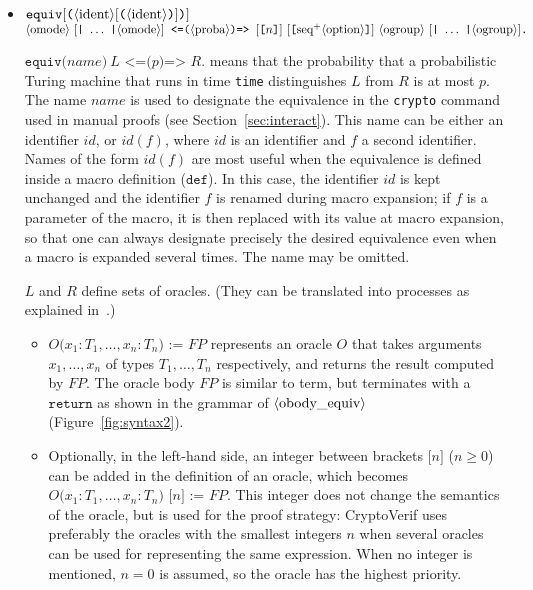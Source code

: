 \begin{itemize}
\ifchannels
\item $\texttt{equiv}[\texttt{(}\langle\textrm{ident}\rangle[\texttt{(}\langle\textrm{ident}\rangle\texttt{)}]\texttt{)}]$\\
$\nonterm{omode}\ [\texttt{|}\ \ldots\ \texttt{|}\nonterm{omode}]\texttt{ <=(}\nonterm{proba}\texttt{)=> }
[\texttt{[}n\texttt{]}]\ [\texttt{[}\neseq{option}\texttt{]}]\ \nonterm{ogroup}\ [\texttt{|}\ \ldots\ \texttt{|}\nonterm{ogroup}]\texttt{.}$

$\texttt{equiv(}\mathit{name}\texttt{)}\ L\texttt{ <=(}p\texttt{)=> }R\texttt{.}$ means that the
probability that a probabilistic Turing machine that runs in time
{\tt time} distinguishes $L$ from $R$ is at most $p$. The name $\mathit{name}$
is used to designate the equivalence in the \texttt{crypto} command used in manual proofs (see Section~\ref{sec:interact}). This name can be either an identifier $\mathit{id}$, or $\mathit{id}(f)$, where $\mathit{id}$ is an identifier and $f$ a second identifier. Names of the form $\mathit{id}(f)$ are most useful when the equivalence is defined inside a macro definition ($\texttt{def}$). In this case, the identifier $\mathit{id}$ is kept unchanged and the identifier $f$ is renamed during macro expansion; if $f$ is a parameter of the macro, it is then replaced with its value at macro expansion, so that one can always designate precisely the desired equivalence even when a macro is expanded several times.
The name may be omitted.

$L$ and $R$ define sets of oracles. (They can be translated into
processes as explained in~\cite{BlanchetEPrint05}.)
\begin{itemize}

\item $O\texttt{(}x_1:T_1, \ldots, x_n:T_n\texttt{) := }\mathit{FP}$ represents
an oracle $O$ that takes arguments $x_1, \ldots, x_n$ of types
$T_1, \ldots, T_n$ respectively, and returns the result computed by $\mathit{FP}$.
The oracle body $\mathit{FP}$ is similar to term, but terminates with
a $\texttt{return}$ as shown in the grammar of $\langle\textrm{obody\_equiv}\rangle$ 
(Figure~\ref{fig:syntax2}).

\item Optionally, in the left-hand side,
an integer between brackets $\texttt{[}n\texttt{]}$ ($n \geq 0$)
can be added in the definition of an oracle, which becomes 
$O\texttt{(}x_1:T_1, \ldots, x_n:T_n\texttt{) [}n\texttt{] := }\mathit{FP}$.
This integer does not change the semantics of the oracle, but is
used for the proof strategy: CryptoVerif uses preferably the oracles
with the smallest integers $n$ when several oracles can be used
for representing the same expression. When no integer is mentioned,
$n = 0$ is assumed, so the oracle has the highest priority.


\end{itemize}
\end{itemize}
